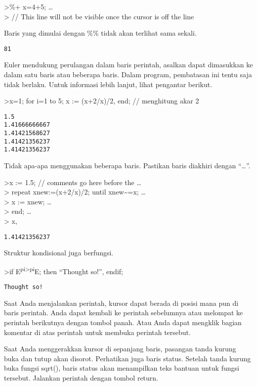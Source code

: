 \documentclass[
]{book}
\begin{document}
\textgreater\%+ x=4+5; \ldots{}\\
\textgreater{} // This line will not be visible once the cursor is off the line

Baris yang dimulai dengan \%\% tidak akan terlihat sama sekali.

\begin{verbatim}
81
\end{verbatim}

Euler mendukung perulangan dalam baris perintah, asalkan dapat dimasukkan ke dalam satu baris atau beberapa baris. Dalam program, pembatasan ini tentu saja tidak berlaku. Untuk informasi lebih lanjut, lihat pengantar berikut.

\textgreater x=1; for i=1 to 5; x := (x+2/x)/2, end; // menghitung akar 2

\begin{verbatim}
1.5
1.41666666667
1.41421568627
1.41421356237
1.41421356237
\end{verbatim}

Tidak apa-apa menggunakan beberapa baris. Pastikan baris diakhiri dengan ``\ldots{}''.

\textgreater x := 1.5; // comments go here before the \ldots{}\\
\textgreater{} repeat xnew:=(x+2/x)/2; until xnew\textasciitilde=x; \ldots{}\\
\textgreater{} x := xnew; \ldots{}\\
\textgreater{} end; \ldots{}\\
\textgreater{} x,

\begin{verbatim}
1.41421356237
\end{verbatim}

Struktur kondisional juga berfungsi.

\textgreater if E\textsuperscript{pi\textgreater pi}E; then ``Thought so!'', endif;

\begin{verbatim}
Thought so!
\end{verbatim}

Saat Anda menjalankan perintah, kursor dapat berada di posisi mana pun di baris perintah. Anda dapat kembali ke perintah sebelumnya atau melompat ke perintah berikutnya dengan tombol panah. Atau Anda dapat mengklik bagian komentar di atas perintah untuk membuka perintah tersebut.

Saat Anda menggerakkan kursor di sepanjang baris, pasangan tanda kurung buka dan tutup akan disorot. Perhatikan juga baris status. Setelah tanda kurung buka fungsi sqrt(), baris status akan menampilkan teks bantuan untuk fungsi tersebut. Jalankan perintah dengan tombol return.
\end{document}
